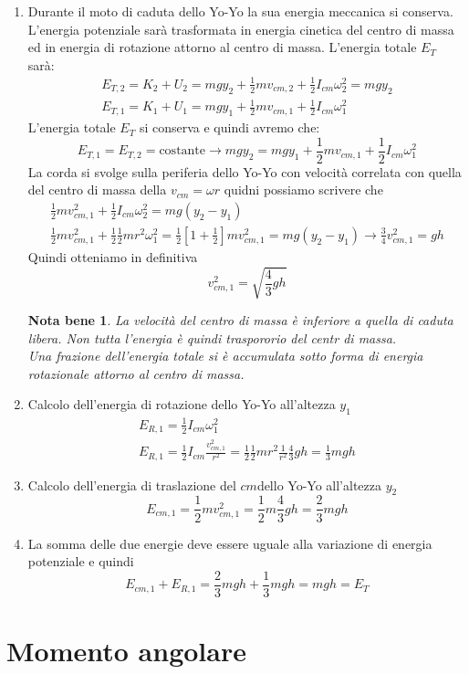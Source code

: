 \documentclass{book}
\newtheorem{notab}{Nota bene}
\begin{document}
\begin{enumerate}
\item Durante il moto di caduta dello Yo-Yo la sua energia meccanica si conserva.
  L'energia potenziale sarà trasformata in energia cinetica del centro di massa ed in
  energia di rotazione attorno al centro di massa. L'energia totale $E_T$ sarà:
  \begin{align*}
    E_{T,2}=K_2+U_2=mgy_2+\frac{1}{2}mv_{cm,2}+\frac{1}{2}I_{cm}\omega_2^2=mgy_2\\
    E_{T,1}=K_1+U_1=mgy_1+\frac{1}{2}mv_{cm,1}+\frac{1}{2}I_{cm}\omega_1^2
  \end{align*}
  L'energia totale $E_T$ si conserva e quindi avremo che:
  \begin{equation*}
    E_{T,1}=E_{T,2}=\text{costante} \to mgy_2=mgy_1+\frac{1}{2}mv_{cm,1}+\frac{1}{2}I_{cm}
    \omega_1^2
  \end{equation*}
  La corda si svolge sulla periferia dello Yo-Yo con velocità correlata con quella del centro
  di massa della $v_{cm}=\omega r$ quidni possiamo scrivere che
  \begin{align*}
    \frac{1}{2}mv_{cm,1}^2+\frac{1}{2}I_{cm}\omega_2^2=mg(y_2-y_1)\\
    \frac{1}{2}mv_{cm,1}^2+\frac{1}{2}\frac{1}{2}mr^2\omega^2_1=\frac{1}{2}\left[1+\frac{1}{2}
    \right] mv^2_{cm,1}=mg(y_2-y_1)\to \frac{3}{4}v_{cm,1}^2=gh
  \end{align*}
  Quindi otteniamo in definitiva
  \begin{equation*}
    v_{cm,1}^2=\sqrt{\frac{4}{3}gh}
  \end{equation*}
  \begin{notab}
    La velocità del centro di massa è inferiore a quella di caduta libera. Non tutta l'energia
    è quindi traspororio del centr di massa.\\
    Una frazione dell'energia totale si è accumulata sotto forma di energia rotazionale
    attorno al centro di massa.
  \end{notab}\clearpage
\item Calcolo dell'energia di rotazione dello Yo-Yo all'altezza $y_1$
  \begin{align*}
    E_{R,1}=\frac{1}{2}I_{cm}\omega_1^2\\
    \boxed{E_{R,1}=\frac{1}{2}I_{cm}\frac{v^2_{cm,1}}{r^2}=\frac{1}{2}\frac{1}{2}mr^2
    \frac{1}{r^2}\frac{4}{3}gh=\frac{1}{3}mgh}
  \end{align*}
\item Calcolo dell'energia di traslazione del $cm$dello Yo-Yo all'altezza $y_2$
  \begin{equation*}
    \boxed{E_{cm,1}=\frac{1}{2}mv^2_{cm,1}=\frac{1}{2}m\frac{4}{3}gh=\frac{2}{3}mgh}
  \end{equation*}
\item La somma delle due energie deve essere uguale alla variazione di energia
  potenziale e quindi
  \begin{equation*}
    \boxed{E_{cm,1}+E_{R,1}=\frac{2}{3}mgh+\frac{1}{3}mgh=mgh=E_T}
  \end{equation*}
\end{enumerate}
\section{Momento angolare}



\end{document}
